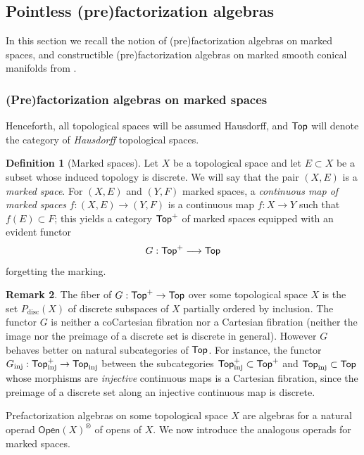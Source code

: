 \documentclass[10pt, reqno, twoside
, final
]{amsart}
\numberwithin{equation}{subsection}%
\theoremstyle{definition}
\newtheorem{defn}{Definition}[subsection]
\theoremstyle{definition}
\theoremstyle{definition}
\theoremstyle{definition}
\theoremstyle{definition}
\theoremstyle{definition}
\theoremstyle{definition}
\theoremstyle{definition}
\theoremstyle{definition}
\theoremstyle{plain}
\theoremstyle{definition}
\theoremstyle{plain}
\theoremstyle{definition}
\theoremstyle{plain}
\theoremstyle{definition}
\newtheorem{rmk}[defn]{Remark}
\theoremstyle{definition}
\theoremstyle{plain}
\theoremstyle{plain}
\theoremstyle{definition}
\theoremstyle{plain}
\theoremstyle{plain}
\theoremstyle{plain}
\begin{document}
\subsection{Pointless (pre)factorization algebras}
In this section we recall the notion of (pre)factorization algebras on marked spaces, and constructible (pre)factorization algebras on marked smooth conical manifolds from \cite{Karlssonthesis, KS}.
\subsubsection{(Pre)factorization algebras on marked spaces}
Henceforth, all topological spaces will be assumed Hausdorff, and $\mathsf{Top}$ will denote the category of \emph{Hausdorff} topological spaces.
\begin{defn}[Marked spaces]
Let $X$ be a topological space and let $E\subset X$ be a subset whose induced topology is discrete. We will say that the pair $(X,E)$ is a \emph{marked space}. For $(X,E)$ and $(Y,F)$ marked spaces, a \emph{continuous map of marked spaces} $f:(X,E)\rightarrow (Y,F)$ is a continuous map $f:X\rightarrow Y$ such that $f(E)\subset F$; this yields a category $\mathsf{Top}^+$ of marked spaces equipped with an evident functor 
\[ G:\mathsf{Top}^+\longrightarrow \mathsf{Top}  \]
forgetting the marking.
\end{defn}
\begin{rmk}
The fiber of $G:\mathsf{Top}^+\rightarrow \mathsf{Top}$ over some topological space $X$ is the set $P_{\mathrm{disc}}(X)$ of discrete subspaces of $X$ partially ordered by inclusion. The functor $G$ is neither a coCartesian fibration nor a Cartesian fibration (neither the image nor the preimage of a discrete set is discrete in general). However $G$ behaves better on natural subcategories of $\mathsf{Top}$. For instance, the functor $G_{\mathrm{inj}}:\mathsf{Top}^+_{\mathrm{inj}}\rightarrow \mathsf{Top}_{\mathrm{inj}}$ between the subcategories $\mathsf{Top}^+_{\mathrm{inj}}\subset \mathsf{Top}^+$ and $\mathsf{Top}_{\mathrm{inj}}\subset \mathsf{Top}$ whose morphisms are \emph{injective} continuous maps is a Cartesian fibration, since the preimage of a discrete set along an injective continuous map is discrete.
\end{rmk}
Prefactorization algebras on some topological space $X$ are algebras for a natural operad $\mathsf{Open}(X)^{\otimes}$ of opens of $X$. We now introduce the analogous operads for marked spaces.
\end{document}
